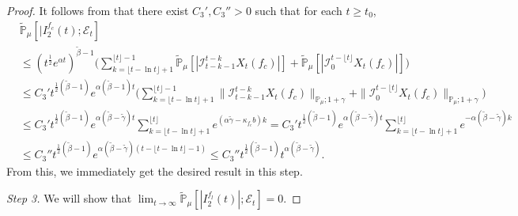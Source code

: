\documentclass[12pt,a4paper]{amsart}
\theoremstyle{plain}
\theoremstyle{definition}
\numberwithin{equation}{section}
\begin{document}
\begin{proof}
It follows from \cite[Lemma 2.13]{RenSongSunZhao2019Stable} that there exist $C_3',C_3''>0$ such that for each $t\geq t_0$,
  \begin{align}
     &\mathbb{\widetilde{P}}_{\mu} [ |I^{f_c}_2(t);{\mathcal{E}_t}] \\
    & \leq  (t^{\frac{1}{2}} e^{\alpha t} )^{\tilde \beta - 1}\Big(\sum_{k=\lfloor t-\ln t \rfloor+1}^{\lfloor t \rfloor - 1}\mathbb{\widetilde{P}}_{\mu} [| \mathcal{I}_{t-k-1}^{t-k} X_t(f_c) |] + \mathbb{\widetilde{P}}_{\mu}[| \mathcal{I}_{0}^{t-\lfloor t\rfloor} X_t(f_c)|]\Big) \\
    & \leq C_3' t^{\frac{1}{2}(\tilde \beta - 1)} e^{\alpha(\tilde \beta - 1)t}\Big(\sum_{k=\lfloor t-\ln t \rfloor+1}^{\lfloor t \rfloor - 1}\|\mathcal{I}_{t-k-1}^{t-k} X_t(f_c) \|_{\mathbb P_\mu; 1+\gamma} + \|\mathcal I_0^{t-\lfloor t \rfloor} X_t(f_c)\|_{\mathbb P_\mu;1+\gamma}\Big) \\
    & \leq C_3' t^{\frac{1}{2}(\tilde \beta - 1)} e^{\alpha (\tilde \beta - \tilde \gamma)t}\sum_{k=\lfloor t-\ln t \rfloor+1}^{\lfloor t \rfloor}  e^{(\alpha\tilde \gamma-\kappa_{f_c} b)k}
      = C_3' t^{\frac{1}{2}(\tilde \beta - 1)} e^{\alpha(\tilde \beta - \tilde \gamma) t}\sum_{k=\lfloor t-\ln t \rfloor+1}^{\lfloor t \rfloor}  e^{-\alpha (\tilde \beta -\tilde \gamma) k}
    \\ & \leq C_3'' t^{\frac{1}{2}(\tilde \beta - 1)} e^{\alpha (\tilde \beta - \tilde \gamma)(t - \lfloor t - \ln t\rfloor-1)}
         \leq C_3'' t^{\frac{1}{2}(\tilde \beta - 1)} t^{\alpha (\tilde \beta - \tilde \gamma)}.
  \end{align}
  From this, we immediately get the desired result in this step.

\emph{Step 3.} We will show that $\lim_{t\rightarrow \infty}\widetilde{\mathbb P}_{\mu}[|I^{f_l}_2(t)|;\mathcal{E}_t]=0$.



\end{proof}
\end{document}
